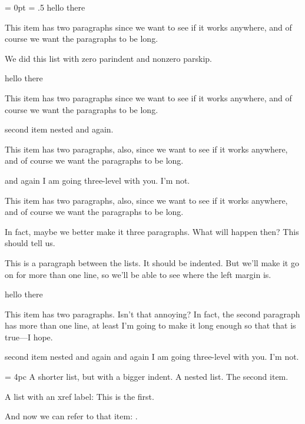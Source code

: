 % 
\ifx\undefined\eplain  \fi

{\parindent = 0pt
 \parskip = .5\baselineskip
\unorderedlist
   \li hello there

       This item has two paragraphs since we want to see if it
       works anywhere, and of course we want the paragraphs to be long.
     
   \li We did this list with zero parindent and nonzero parskip.
\endunorderedlist
}

\unorderedlist
   \li hello there

       This item has two paragraphs since we want to see if it
       works anywhere, and of course we want the paragraphs to be long.

   \li second item
   \numberedlist
      \li nested
      \li and again.

          This item has two paragraphs, also, since we want to see if it
          works anywhere, and of course we want the paragraphs to be long.

      \li and again
      \numberedlist
         \li I am going three-level with you.
      \endnumberedlist
      \unorderedlist
         \li I'm not.

             This item has two paragraphs, also, since we want to see if
             it works anywhere, and of course we want the paragraphs to
             be long.
             
             In fact, maybe we better make it three paragraphs. What
             will happen then? This should tell us.

      \endunorderedlist
   \endnumberedlist
\endunorderedlist

This is a paragraph between the lists. It should be indented. But we'll
make it go on for more than one line, so we'll be able to see where the
left margin is.

\numberedlist
   \li hello there
       
       This item has two paragraphs. Isn't that annoying?
       In fact, the second paragraph has more than one line, at least
       I'm going to make it long enough so that that is true---I hope.
       
   \li second item
   \numberedlist
      \li nested
      \li and again
      \li and again
      \numberedlist
         \li I am going three-level with you.
      \endnumberedlist
      \unorderedlist
         \li I'm not.
      \endunorderedlist
   \endnumberedlist
\endnumberedlist

\listleftindent = 4pc
\unorderedlist
\li A shorter list, but with a bigger indent.
\numberedlist \li A nested list.
\endnumberedlist
\li The second item.
\endunorderedlist

A list with an xref label:
\numberedlist
\li[listitem] This is the first.
\endnumberedlist

And now we can refer to that item: .
\bye
